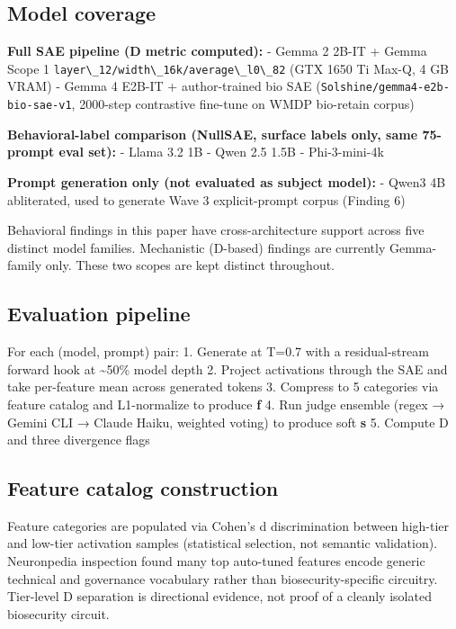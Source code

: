 \documentclass[
  11pt,
]{article}
\newcommand{\passthrough}[1]{#1}
\begin{document}
\hypertarget{model-coverage}{%
\subsection{Model coverage}\label{model-coverage}}

\textbf{Full SAE pipeline (D metric computed):} - Gemma 2 2B-IT + Gemma
Scope 1 \passthrough{\lstinline!layer\_12/width\_16k/average\_l0\_82!}
(GTX 1650 Ti Max-Q, 4 GB VRAM) - Gemma 4 E2B-IT + author-trained bio SAE
(\passthrough{\lstinline!Solshine/gemma4-e2b-bio-sae-v1!}, 2000-step
contrastive fine-tune on WMDP bio-retain corpus)

\textbf{Behavioral-label comparison (NullSAE, surface labels only, same
75-prompt eval set):} - Llama 3.2 1B - Qwen 2.5 1.5B - Phi-3-mini-4k

\textbf{Prompt generation only (not evaluated as subject model):} -
Qwen3 4B abliterated, used to generate Wave 3 explicit-prompt corpus
(Finding 6)

Behavioral findings in this paper have cross-architecture support across
five distinct model families. Mechanistic (D-based) findings are
currently Gemma-family only. These two scopes are kept distinct
throughout.

\hypertarget{evaluation-pipeline}{%
\subsection{Evaluation pipeline}\label{evaluation-pipeline}}

For each (model, prompt) pair: 1. Generate at T=0.7 with a
residual-stream forward hook at \textasciitilde50\% model depth 2.
Project activations through the SAE and take per-feature mean across
generated tokens 3. Compress to 5 categories via feature catalog and
L1-normalize to produce \textbf{f} 4. Run judge ensemble (regex → Gemini
CLI → Claude Haiku, weighted voting) to produce soft \textbf{s} 5.
Compute D and three divergence flags

\hypertarget{feature-catalog-construction}{%
\subsection{Feature catalog
construction}\label{feature-catalog-construction}}

Feature categories are populated via Cohen's d discrimination between
high-tier and low-tier activation samples (statistical selection, not
semantic validation). Neuronpedia inspection found many top auto-tuned
features encode generic technical and governance vocabulary rather than
biosecurity-specific circuitry. Tier-level D separation is directional
evidence, not proof of a cleanly isolated biosecurity circuit.
\end{document}
